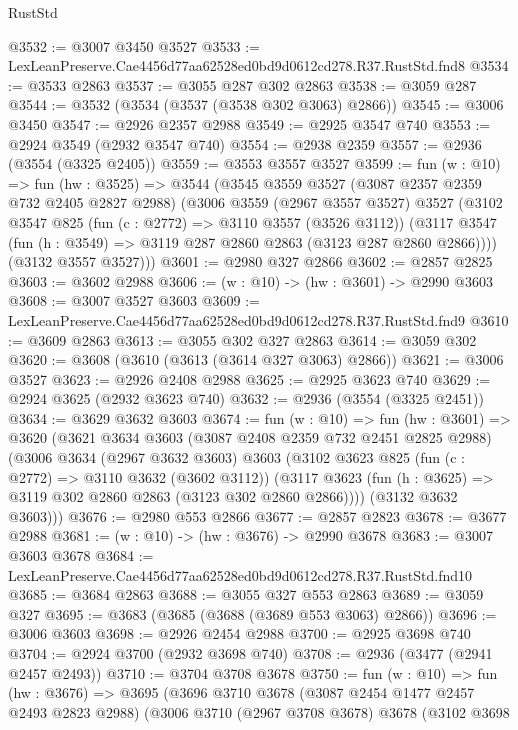 \begin{lexlean}{RustStd}
\begin{coremodule}
@3532 := @3007 @3450 @3527
@3533 := LexLeanPreserve.Cae4456d77aa62528ed0bd9d0612cd278.R37.RustStd.fnd8
@3534 := @3533 @2863
@3537 := @3055 @287 @302 @2863
@3538 := @3059 @287
@3544 := @3532 (@3534 (@3537 (@3538 @302 @3063) @2866))
@3545 := @3006 @3450
@3547 := @2926 @2357 @2988
@3549 := @2925 @3547 @740
@3553 := @2924 @3549 (@2932 @3547 @740)
@3554 := @2938 @2359
@3557 := @2936 (@3554 (@3325 @2405))
@3559 := @3553 @3557 @3527
@3599 := fun (w : @10) =>
  fun (hw : @3525) =>
  @3544
    (@3545
      @3559
      @3527
      (@3087 @2357 @2359 @732 @2405 @2827 @2988)
      (@3006
        @3559
        (@2967 @3557 @3527)
        @3527
        (@3102
          @3547
          @825
          (fun (c : @2772) => @3110 @3557 (@3526 @3112))
          (@3117 @3547 (fun (h : @3549) => @3119 @287 @2860 @2863 (@3123 @287 @2860 @2866))))
        (@3132 @3557 @3527)))
@3601 := @2980 @327 @2866
@3602 := @2857 @2825
@3603 := @3602 @2988
@3606 := (w : @10) -> (hw : @3601) -> @2990 @3603
@3608 := @3007 @3527 @3603
@3609 := LexLeanPreserve.Cae4456d77aa62528ed0bd9d0612cd278.R37.RustStd.fnd9
@3610 := @3609 @2863
@3613 := @3055 @302 @327 @2863
@3614 := @3059 @302
@3620 := @3608 (@3610 (@3613 (@3614 @327 @3063) @2866))
@3621 := @3006 @3527
@3623 := @2926 @2408 @2988
@3625 := @2925 @3623 @740
@3629 := @2924 @3625 (@2932 @3623 @740)
@3632 := @2936 (@3554 (@3325 @2451))
@3634 := @3629 @3632 @3603
@3674 := fun (w : @10) =>
  fun (hw : @3601) =>
  @3620
    (@3621
      @3634
      @3603
      (@3087 @2408 @2359 @732 @2451 @2825 @2988)
      (@3006
        @3634
        (@2967 @3632 @3603)
        @3603
        (@3102
          @3623
          @825
          (fun (c : @2772) => @3110 @3632 (@3602 @3112))
          (@3117 @3623 (fun (h : @3625) => @3119 @302 @2860 @2863 (@3123 @302 @2860 @2866))))
        (@3132 @3632 @3603)))
@3676 := @2980 @553 @2866
@3677 := @2857 @2823
@3678 := @3677 @2988
@3681 := (w : @10) -> (hw : @3676) -> @2990 @3678
@3683 := @3007 @3603 @3678
@3684 := LexLeanPreserve.Cae4456d77aa62528ed0bd9d0612cd278.R37.RustStd.fnd10
@3685 := @3684 @2863
@3688 := @3055 @327 @553 @2863
@3689 := @3059 @327
@3695 := @3683 (@3685 (@3688 (@3689 @553 @3063) @2866))
@3696 := @3006 @3603
@3698 := @2926 @2454 @2988
@3700 := @2925 @3698 @740
@3704 := @2924 @3700 (@2932 @3698 @740)
@3708 := @2936 (@3477 (@2941 @2457 @2493))
@3710 := @3704 @3708 @3678
@3750 := fun (w : @10) =>
  fun (hw : @3676) =>
  @3695
    (@3696
      @3710
      @3678
      (@3087 @2454 @1477 @2457 @2493 @2823 @2988)
      (@3006
        @3710
        (@2967 @3708 @3678)
        @3678
        (@3102
          @3698

\end{coremodule}
\end{lexlean}

